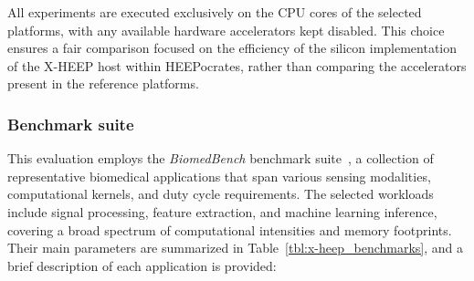                All experiments are executed exclusively on the CPU cores of the selected platforms, with any available hardware accelerators kept disabled. This choice ensures a fair comparison focused on the efficiency of the silicon implementation of the \mbox{X-HEEP} host within \mbox{HEEPocrates}, rather than comparing the accelerators present in the reference platforms.

            \subsubsection*{Benchmark suite}
            
                This evaluation employs the \emph{BiomedBench} benchmark suite~\cite{biomed}, a collection of representative biomedical applications that span various sensing modalities, computational kernels, and duty cycle requirements. The selected workloads include signal processing, feature extraction, and machine learning inference, covering a broad spectrum of computational intensities and memory footprints. Their main parameters are summarized in Table~\ref{tbl:x-heep_benchmarks}, and a brief description of each application is provided:

